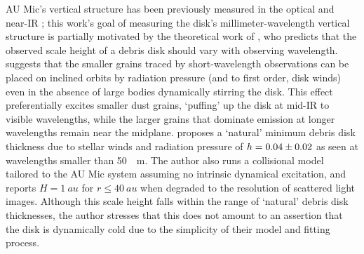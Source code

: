 \documentclass[modern]{aastex62}
\begin{document}
AU Mic's vertical structure has been previously measured in the optical and near-IR \citep[e.g.][]{krist05,metchev05}; this work's goal of measuring the disk's millimeter-wavelength vertical structure is partially motivated by the theoretical work of \cite{thebault09}, who predicts that the observed scale height of a debris disk should vary with observing wavelength.
\citet{thebault09} suggests that the smaller grains traced by short-wavelength observations can be placed on inclined orbits by radiation pressure (and to first order, disk winds) even in the absence of large bodies dynamically stirring the disk. 
This effect preferentially excites smaller dust grains, `puffing' up the disk at mid-IR to visible wavelengths, while the larger grains that dominate emission at longer wavelengths remain near the midplane.
\citet{thebault09} proposes a `natural' minimum debris disk thickness due to stellar winds and radiation pressure of $h = \num{0.04 \pm 0.02}$ as seen at wavelengths smaller than \SI{50}{\mu \meter}.
The author also runs a collisional model tailored to the AU Mic system assuming no intrinsic dynamical excitation, and reports $H = \SI{1}{au}$ for $r \leq \SI{40}{au}$ when degraded to the resolution of scattered light images.
Although this scale height falls within the range of `natural' debris disk thicknesses, the author stresses that this does not amount to an assertion that the disk is dynamically cold due to the simplicity of their model and fitting process.
\end{document}
